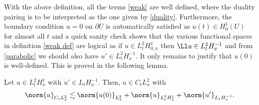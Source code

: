 \documentclass[
    a4paper,
    DIV=14,
    abstract=true,
    numbers=noenddot
]{scrartcl}
\begin{document}
With the above definition, all the terms \eqref{weak} are well defined, where the duality pairing is to be interpreted as the one given by \eqref{duality}. Furthermore, the boundary condition $u=0$ on $\partial U$ is automatically satisfied as $u(t) \in H_0^1(U)$ for almost all $t$ and a quick sanity check shows that the various functional spaces in definition \ref{weak def} are logical as if $u \in L^2_t H^1_{0,x}$ then $\Ll u \in L^2_t H^{-1}_x$ and from \eqref{parabolic} we should also have $u' \in L^2_t H^{-1}_x$. It only remains to justify that $u(0)$ is well-defined. This is proved in the following lemma.

\begin{lemma}\label{continuity weak}
 Let $u \in L_t^2H_{x}^1$ with $u' \in L_tH_x^{-1}$. Then, $u \in C_t L_x^2$ with
  \begin{align*}
    \norm{u}_{C_t L_x^2} \lesssim \norm{u(0)}_{L_x^2}+ \norm{u}_{L_t^2H_{x}^1}+ \norm{u'}_{L_tH_x^{-1}}.
  \end{align*}

\end{lemma}
\end{document}
